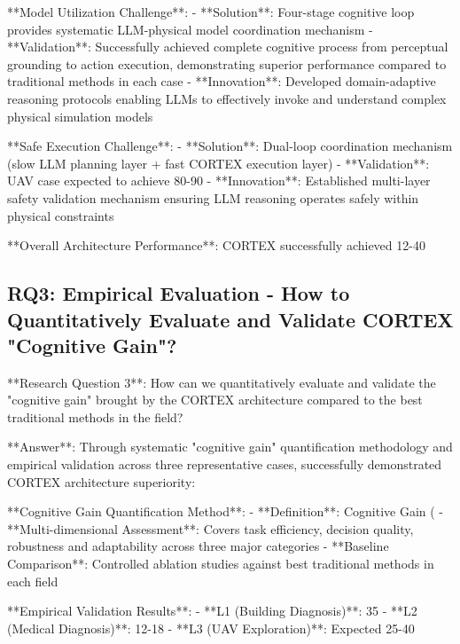 **Model Utilization Challenge**:
- **Solution**: Four-stage cognitive loop provides systematic LLM-physical model coordination mechanism
- **Validation**: Successfully achieved complete cognitive process from perceptual grounding to action execution, demonstrating superior performance compared to traditional methods in each case
- **Innovation**: Developed domain-adaptive reasoning protocols enabling LLMs to effectively invoke and understand complex physical simulation models

**Safe Execution Challenge**:
- **Solution**: Dual-loop coordination mechanism (slow LLM planning layer + fast CORTEX execution layer)
- **Validation**: UAV case expected to achieve 80-90%
- **Innovation**: Established multi-layer safety validation mechanism ensuring LLM reasoning operates safely within physical constraints

**Overall Architecture Performance**: CORTEX successfully achieved 12-40%

\subsection{RQ3: Empirical Evaluation - How to Quantitatively Evaluate and Validate CORTEX "Cognitive Gain"?}

**Research Question 3**: How can we quantitatively evaluate and validate the "cognitive gain" brought by the CORTEX architecture compared to the best traditional methods in the field?

**Answer**: Through systematic "cognitive gain" quantification methodology and empirical validation across three representative cases, successfully demonstrated CORTEX architecture superiority:

**Cognitive Gain Quantification Method**:
- **Definition**: Cognitive Gain (%
- **Multi-dimensional Assessment**: Covers task efficiency, decision quality, robustness and adaptability across three major categories
- **Baseline Comparison**: Controlled ablation studies against best traditional methods in each field

**Empirical Validation Results**:
- **L1 (Building Diagnosis)**: 35%
- **L2 (Medical Diagnosis)**: 12-18%
- **L3 (UAV Exploration)**: Expected 25-40%

